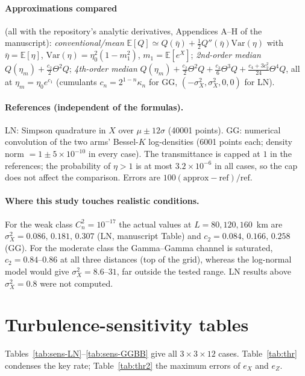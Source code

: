 \documentclass[11pt,a4paper]{article}
\begin{document}
\paragraph{Approximations compared} (all with the repository's analytic derivatives, Appendices A--H of the manuscript): \emph{conventional/mean} $\mathbb E[Q]\simeq Q(\bar\eta)+\tfrac12Q''(\bar\eta)\mathrm{Var}(\eta)$ with $\bar\eta=\mathbb E[\eta]$, $\mathrm{Var}(\eta)=\eta_0^2(1-m_1^2)$, $m_1=\mathbb E[e^X]$; \emph{2nd-order median} $Q(\eta_m)+\tfrac{c_2}{2}\Theta^2Q$; \emph{4th-order median} $Q(\eta_m)+\tfrac{c_2}{2}\Theta^2Q+\tfrac{c_3}{6}\Theta^3Q+\tfrac{c_4+3c_2^2}{24}\Theta^4Q$, all at $\eta_m=\eta_0e^{c_1}$ (cumulants $c_n=2^{1-n}\kappa_n$ for GG, $(-\sigma_X^2,\sigma_X^2,0,0)$ for LN).

\paragraph{References (independent of the formulas).} LN: Simpson quadrature in $X$ over $\mu\pm12\sigma$ (40001 points). GG: numerical convolution of the two arms' Bessel-$K$ log-densities (6001 points each; density norm $=1\pm5\times10^{-10}$ in every case). The transmittance is capped at $1$ in the references; the probability of $\eta>1$ is at most $3.2\times10^{-6}$ in all cases, so the cap does not affect the comparison. Errors are $100(\text{approx}-\text{ref})/\text{ref}$.

\paragraph{Where this study touches realistic conditions.} For the weak class $C_n^2=10^{-17}$ the actual values at $L=80,120,160$~km are $\sigma_X^2=0.086,\,0.181,\,0.307$ (LN, manuscript Table) and $c_2=0.084,\,0.166,\,0.258$ (GG). For the moderate class the Gamma--Gamma channel is saturated, $c_2=0.84$--$0.86$ at all three distances (top of the grid), whereas the log-normal model would give $\sigma_X^2=8.6$--$31$, far outside the tested range. LN results above $\sigma_X^2=0.8$ were not computed.

\section{Turbulence-sensitivity tables}
Tables~\ref{tab:sens-LN}--\ref{tab:sens-GGBB} give all $3\times3\times12$ cases. Table~\ref{tab:thr} condenses the key rate; Table~\ref{tab:thr2} the maximum errors of $e_X$ and $e_Z$.
\end{document}
